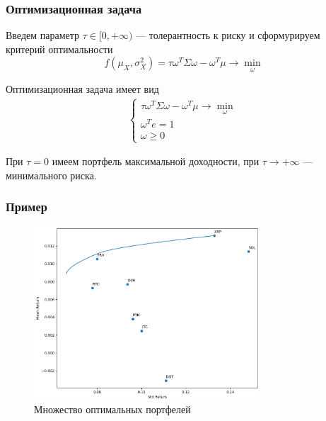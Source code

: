 \documentclass{beamer}
\begin{document}
\begin{frame}
    \frametitle{Оптимизационная задача}
    Введем параметр $\tau \in [0, +\infty)$ --- толерантность к риску и сформурируем критерий оптимальности
    \[ 
        f(\mu_X, \sigma_X^2) = \tau \omega^T \Sigma \omega - \omega^T \mu \rightarrow \min_{\omega}
    \]

    Оптимизационная задача имеет вид
    \begin{align*}
        \begin{cases}
            \tau \omega^T \Sigma \omega - \omega^T \mu \rightarrow \min_{\omega} \\
            \omega^T e = 1 \\
            \omega \ge 0
        \end{cases}
    \end{align*}

    При $\tau=0$ имеем портфель максимальной доходности, при $\tau \rightarrow +\infty$
    --- минимального риска.
\end{frame}

\begin{frame}
    \frametitle{Пример}
    \begin{figure}
        \centering
        \includegraphics[width=0.75\textwidth]{frontier_example_cut.png}
        \caption{Множество оптимальных портфелей}
        \label{fig:frontier_example}
    \end{figure}
\end{frame}

\end{document}

